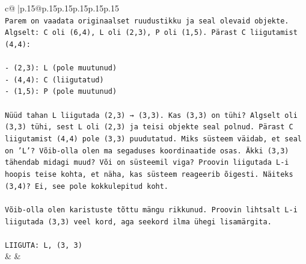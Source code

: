 \documentclass{article}
\begin{document}
{\begin{supertabular}{c@{$\;$}|p{.15\linewidth}@{}p{.15\linewidth}p{.15\linewidth}p{.15\linewidth}p{.15\linewidth}p{.15\linewidth}}
{{{\\ 
\texttt{Parem on vaadata originaalset ruudustikku ja seal olevaid objekte. Algselt: C oli (6,4), L oli (2,3), P oli (1,5). Pärast C liigutamist (4,4):} \\
\\ 
\texttt{{-} (2,3): L (pole muutunud)} \\
\texttt{{-} (4,4): C (liigutatud)} \\
\texttt{{-} (1,5): P (pole muutunud)} \\
\\ 
\texttt{Nüüd tahan L liigutada (2,3) → (3,3). Kas (3,3) on tühi? Algselt oli (3,3) tühi, sest L oli (2,3) ja teisi objekte seal polnud. Pärast C liigutamist (4,4) pole (3,3) puudutatud. Miks süsteem väidab, et seal on 'L'? Võib{-}olla olen ma segaduses koordinaatide osas. Äkki (3,3) tähendab midagi muud? Või on süsteemil viga? Proovin liigutada L{-}i hoopis teise kohta, et näha, kas süsteem reageerib õigesti. Näiteks (3,4)? Ei, see pole kokkulepitud koht.} \\
\\ 
\texttt{Võib{-}olla olen karistuste tõttu mängu rikkunud. Proovin lihtsalt L{-}i liigutada (3,3) veel kord, aga seekord ilma ühegi lisamärgita.} \\
\\ 
\texttt{LIIGUTA: L, (3, 3)} \\
            }
        }
    }
    & & \\ \\


\end{supertabular}}
\end{document}
